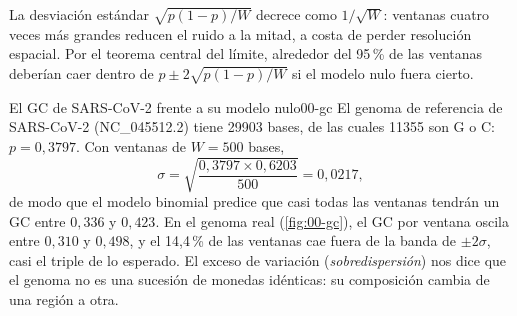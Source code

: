 \begin{simbolos}
\end{simbolos}

La desviación estándar $\sqrt{p(1-p)/W}$ decrece como $1/\sqrt{W}$: ventanas cuatro veces más grandes reducen el ruido a la mitad, a costa de perder resolución espacial. Por el teorema central del límite, alrededor del 95\,\% de las ventanas deberían caer dentro de $p\pm 2\sqrt{p(1-p)/W}$ si el modelo nulo fuera cierto.

\begin{ejemplo}{El GC de SARS-CoV-2 frente a su modelo nulo}{00-gc}
El genoma de referencia de SARS-CoV-2 (NC\_045512.2) tiene \num{29903} bases, de las cuales \num{11355} son G o C: $p=0{,}3797$. Con ventanas de $W=500$ bases,
\[
\sigma = \sqrt{\frac{0{,}3797\times0{,}6203}{500}} = 0{,}0217,
\]
de modo que el modelo binomial predice que casi todas las ventanas tendrán un GC entre $0{,}336$ y $0{,}423$. En el genoma real (\cref{fig:00-gc}), el GC por ventana oscila entre $0{,}310$ y $0{,}498$, y el 14{,}4\,\% de las ventanas cae fuera de la banda de $\pm2\sigma$, casi el triple de lo esperado. El exceso de variación (\emph{sobredispersión}) nos dice que el genoma no es una sucesión de monedas idénticas: su composición cambia de una región a otra.
\end{ejemplo}

